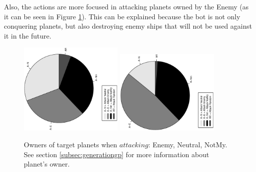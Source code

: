\documentclass[conference]{IEEEtran}
\begin{document}
Also, the actions are more focused in attacking planets owned by the Enemy (as it can be seen in Figure \ref{figura:tarta_attacking_who}). This can be explained because the bot is not only conquering planets, but also destroying enemy ships that will not be used against it in the future.
\begin{figure}[htb]
\tiny
\begin{center}

    \includegraphics[trim=1cm 7cm 1cm 7cm, clip=true,width=5cm,angle=-90]{./imags/distribution_initial_target.eps}
    \includegraphics[trim=1cm 7cm 1cm 7cm, clip=true,width=5cm,angle=-90]{./imags/distribution_final_target.eps}

\end{center}
\caption{Owners of target planets when $attacking$: Enemy, Neutral, NotMy. See section \ref{subsec:generationgp} for more information about planet's owner.} %
\label{figura:tarta_attacking_who}
\end{figure}
\end{document}
